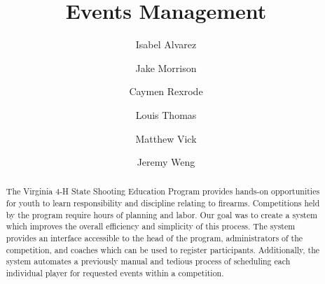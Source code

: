 \documentclass[sigconf]{acmart}
\begin{document}
%
\title{Events Management}

%
\author{Isabel Alvarez}

\author{Jake Morrison}

\author{Caymen Rexrode}

\author{Louis Thomas}
 
\author{Matthew Vick}

\author{Jeremy Weng}

%
\renewcommand{\shortauthors}{Events Management}

%
\begin{abstract}

The Virginia 4-H State Shooting Education Program provides hands-on opportunities for youth to learn responsibility and discipline relating to firearms. Competitions held by the program require hours of planning and labor. Our goal was to create a system which improves the overall efficiency and simplicity of this process. The system provides an interface accessible to the head of the program, administrators of the competition, and coaches which can be used to register participants. Additionally, the system automates a previously manual and tedious process of scheduling each individual player for requested events within a competition.
\end{abstract}
\end{document}

